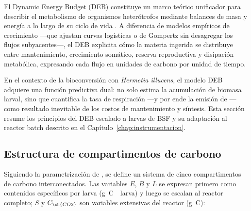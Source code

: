 
El Dynamic Energy Budget (DEB) constituye un marco teórico unificador para describir el metabolismo de organismos heterótrofos mediante balances de masa y energía a lo largo de su ciclo de vida \parencite{eriksenDynamicModellingFeed2022}. A diferencia de modelos empíricos de crecimiento ---que ajustan curvas logísticas o de Gompertz sin desagregar los flujos subyacentes---, el DEB explicita cómo la materia ingerida se distribuye entre mantenimiento, crecimiento somático, reserva reproductiva y disipación metabólica, expresando cada flujo en unidades de carbono por unidad de tiempo.

En el contexto de la bioconversión con \emph{Hermetia illucens}, el modelo DEB adquiere una función predictiva dual: no solo estima la acumulación de biomasa larval, sino que cuantifica la tasa de respiración ---y por ende la emisión de --- como resultado inevitable de los costos de mantenimiento y síntesis. Esta sección resume los principios del DEB escalado a larvas de BSF y su adaptación al reactor batch descrito en el Capítulo~\ref{chap:instrumentacion}.

\subsection{Estructura de compartimentos de carbono}
\label{subsec:cap3_compartimentos}

Siguiendo la parametrización de \textcite{eriksenDynamicModellingFeed2022}, se define un sistema de cinco compartimentos de carbono interconectados. Las variables $E$, $B$ y $L$ se expresan primero como contenidos específicos por larva (\si{\gram C \per larva}) y luego se escalan al reactor completo; $S$ y $C_{\ch{CO2}}$ son variables extensivas del reactor (\si{\gram C}):


